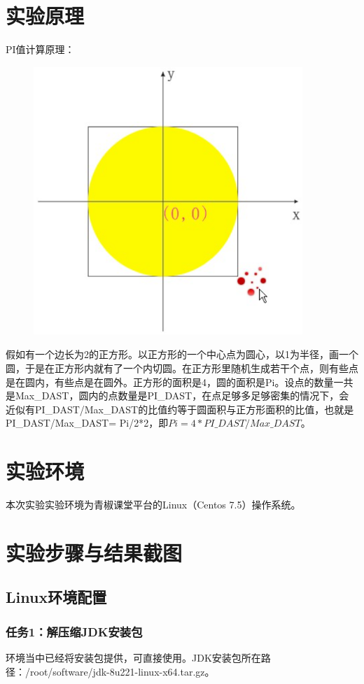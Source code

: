 \documentclass {article}
\begin{document}
	\section{实验原理}
		PI值计算原理：
		\begin{figure}[H]
			\centering
			\includegraphics[width=4in,height=4in]{figures/fig1.jpg}
		\end{figure}

		假如有一个边长为2的正方形。以正方形的一个中心点为圆心，以1为半径，画一个圆，于是在正方形内就有了一个内切圆。在正方形里随机生成若干个点，则有些点是在圆内，有些点是在圆外。正方形的面积是4，圆的面积是Pi。设点的数量一共是Max\_DAST，圆内的点数量是PI\_DAST，在点足够多足够密集的情况下，会近似有PI\_DAST/Max\_DAST的比值约等于圆面积与正方形面积的比值，也就是PI\_DAST/Max\_DAST= Pi/2*2，即$Pi=4*PI\_DAST/Max\_DAST$。
	
	\section{实验环境}
		本次实验实验环境为青椒课堂平台的Linux（Centos 7.5）操作系统。
	
	\section{实验步骤与结果截图}
		\subsection{Linux环境配置}
			\subsubsection{任务1：解压缩JDK安装包}
				环境当中已经将安装包提供，可直接使用。JDK安装包所在路径：/root/software/jdk-8u221-linux-x64.tar.gz。
				
\end{document}

